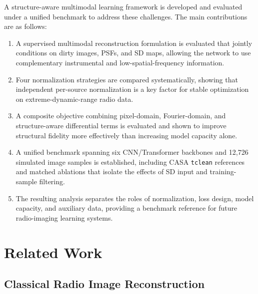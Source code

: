 \documentclass[twocolumn]{aastex631}
\begin{document}
A structure-aware multimodal learning framework is developed and evaluated under a unified benchmark to address these challenges.
The main contributions are as follows:
\begin{enumerate}
	\item A supervised multimodal reconstruction formulation is evaluated that jointly conditions on dirty images, PSFs, and SD maps, allowing the network to use complementary instrumental and low-spatial-frequency information.
	\item Four normalization strategies are compared systematically, showing that independent per-source normalization is a key factor for stable optimization on extreme-dynamic-range radio data.
	\item A composite objective combining pixel-domain, Fourier-domain, and structure-aware differential terms is evaluated and shown to improve structural fidelity more effectively than increasing model capacity alone.
	\item A unified benchmark spanning six CNN/Transformer backbones and 12,726 simulated image samples is established, including CASA \texttt{tclean} references and matched ablations that isolate the effects of SD input and training-sample filtering.
	\item The resulting analysis separates the roles of normalization, loss design, model capacity, and auxiliary data, providing a benchmark reference for future radio-imaging learning systems.
\end{enumerate}

\section{Related Work}
\label{sec:related}

\subsection{Classical Radio Image Reconstruction}
\end{document}

